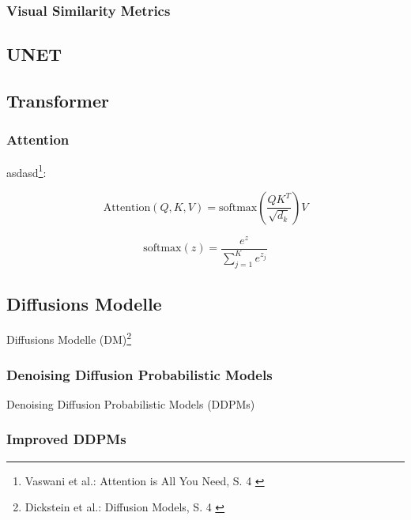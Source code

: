 \subsubsection{Visual Similarity Metrics}




\subsection{UNET}

\subsection{Transformer}


\subsubsection{Attention}

asdasd\footnote{
    Vaswani et al.: Attention is All You Need, S. 4
    \cite{vaswani2023attentionneed}
}:

\begin{equation}
    \text{Attention}(Q, K, V) = \text{softmax}
    \left (
        \frac {QK^T} {\sqrt{d_k}}
    \right ) V
\end{equation}

\begin{equation}
    \text{softmax}(z) = \frac{e^z}{\sum_{j=1}^K e^{z_j}}
\end{equation}

\subsection{Diffusions Modelle}
Diffusions Modelle (DM)\footnote{
    Dickstein et al.: Diffusion Models, S. 4
    \cite{pmlr-v37-sohl-dickstein15}
}



\subsubsection{Denoising Diffusion Probabilistic Models}
Denoising Diffusion Probabilistic Models (DDPMs)

\subsubsection{Improved DDPMs}

